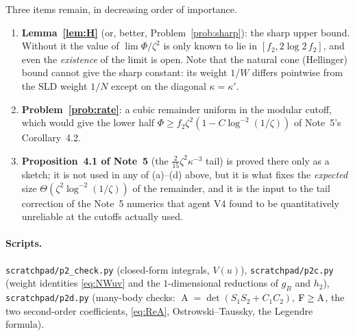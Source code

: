 \documentclass[11pt]{article}
\newcommand{\Hell}{\operatorname{A}}
\theoremstyle{definition}\newtheorem{problem}[theorem]{Problem}
\begin{document}
\begin{verdictgap}
Three items remain, in decreasing order of importance.
\begin{enumerate}[label=(\arabic*),leftmargin=2em]
\item \textbf{Lemma~\ref{lem:H}} (or, better, Problem~\ref{prob:sharp}): the sharp upper bound.
 Without it the value of \(\lim\Phi/\zeta^2\) is only known to lie in
 \([f_2,2\log2\,f_2]\), and even the \emph{existence} of the limit is open.  Note that the natural
 cone (Hellinger) bound cannot give the sharp constant: its weight \(1/W\) differs pointwise from
 the SLD weight \(1/N\) except on the diagonal \(\kappa=\kappa'\).
\item \textbf{Problem~\ref{prob:rate}}: a cubic remainder uniform in the modular cutoff, which would
 give the lower half \(\Phi\ge f_2\zeta^2(1-C\log^{-2}(1/\zeta))\) of Note~5's Corollary~4.2.
\item \textbf{Proposition~4.1 of Note~5} (the \(\frac2{15}\zeta^2\kappa^{-3}\) tail) is proved there
 only as a sketch; it is not used in any of (a)--(d) above, but it is what fixes the
 \emph{expected} size \(\Theta(\zeta^2\log^{-2}(1/\zeta))\) of the remainder, and it is the input to
 the tail correction of the Note~5 numerics that agent V4 found to be quantitatively unreliable at
 the cutoffs actually used.
\end{enumerate}
\end{verdictgap}

\paragraph{Scripts.}
\texttt{scratchpad/p2\_check.py} (closed-form integrals, \(V(u)\)),
\texttt{scratchpad/p2c.py} (weight identities \eqref{eq:NWuv} and the \(1\)-dimensional reductions of
\(g_B\) and \(h_2\)),
\texttt{scratchpad/p2d.py} (many-body checks: \(\Hell=\det(S_1S_2+C_1C_2)\), \(\Fid\ge\Hell\), the two
second-order coefficients, \eqref{eq:ReA}, Ostrowski--Taussky, the Legendre formula).
\end{document}
